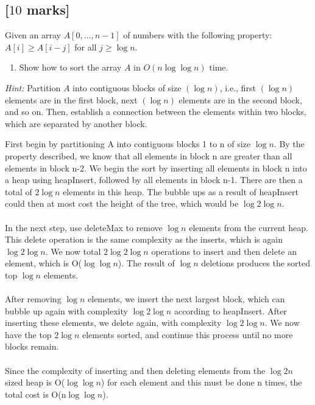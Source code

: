 \documentclass[12pt]{article}
\begin{document}
\subsection{[$10$ marks]}

Given an array $A [0, \ldots, n - 1]$ of numbers with the following property:
$A [i] \geq A [i - j]$ for all $j \geq \log n$.
\begin{enumerate}
  \item Show how to sort the array $A$ in $O (n \log \log n)$ time.
\end{enumerate}
\emph{Hint:} Partition $A$ into contiguous blocks of size $(\log n)$,
i.e., first $(\log n)$ elements are in the first block, next $(\log n)$
elements are in the second block, and so on. Then, establish a connection
between the elements within two blocks, which are separated by another block.

First begin by partitioning A into contiguous blocks 1 to n of size $\log n$. By the property described, we know that all elements in block n are greater than all elements in block n-2. We begin the sort by inserting all elements in block n into a heap using heapInsert, followed by all elements in block n-1. There are then a total of $2\log n$ elements in this heap. The bubble ups as a result of heapInsert could then at most cost the height of the tree, which would be $\log 2\log n$.\\\\
In the next step, use deleteMax to remove $\log n$ elements from the current heap. This delete operation is the same complexity as the inserts, which is again $\log 2\log n$. We now total $2\log 2\log n$ operations to insert and then delete an element, which is O($\log \log n$). The result of $\log n$ deletions produces the sorted top $\log n$ elements.\\\\

After removing $\log n$ elements, we insert the next largest block, which can bubble up again with complexity $\log 2 \log n$ according to heapInsert. After inserting these elements, we delete again, with complexity $\log 2 \log n$. We now have the top $2\log n$ elements sorted, and continue this process until no more blocks remain.\\\\

Since the complexity of inserting and then deleting elements from the $\log 2n$ sized heap is O($\log \log n$) for each element and this must be done n times, the total cost is O(n$\log \log n$).
\end{document}
